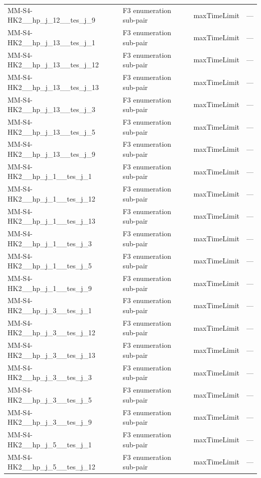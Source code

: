 \begin{table}[htbp]
\begin{tabular}{lllr}
  MM-S4-HK2\_\_hp\_j\_12\_\_tes\_j\_9 & F3 enumeration sub-pair & maxTimeLimit & — \\
  MM-S4-HK2\_\_hp\_j\_13\_\_tes\_j\_1 & F3 enumeration sub-pair & maxTimeLimit & — \\
  MM-S4-HK2\_\_hp\_j\_13\_\_tes\_j\_12 & F3 enumeration sub-pair & maxTimeLimit & — \\
  MM-S4-HK2\_\_hp\_j\_13\_\_tes\_j\_13 & F3 enumeration sub-pair & maxTimeLimit & — \\
  MM-S4-HK2\_\_hp\_j\_13\_\_tes\_j\_3 & F3 enumeration sub-pair & maxTimeLimit & — \\
  MM-S4-HK2\_\_hp\_j\_13\_\_tes\_j\_5 & F3 enumeration sub-pair & maxTimeLimit & — \\
  MM-S4-HK2\_\_hp\_j\_13\_\_tes\_j\_9 & F3 enumeration sub-pair & maxTimeLimit & — \\
  MM-S4-HK2\_\_hp\_j\_1\_\_tes\_j\_1 & F3 enumeration sub-pair & maxTimeLimit & — \\
  MM-S4-HK2\_\_hp\_j\_1\_\_tes\_j\_12 & F3 enumeration sub-pair & maxTimeLimit & — \\
  MM-S4-HK2\_\_hp\_j\_1\_\_tes\_j\_13 & F3 enumeration sub-pair & maxTimeLimit & — \\
  MM-S4-HK2\_\_hp\_j\_1\_\_tes\_j\_3 & F3 enumeration sub-pair & maxTimeLimit & — \\
  MM-S4-HK2\_\_hp\_j\_1\_\_tes\_j\_5 & F3 enumeration sub-pair & maxTimeLimit & — \\
  MM-S4-HK2\_\_hp\_j\_1\_\_tes\_j\_9 & F3 enumeration sub-pair & maxTimeLimit & — \\
  MM-S4-HK2\_\_hp\_j\_3\_\_tes\_j\_1 & F3 enumeration sub-pair & maxTimeLimit & — \\
  MM-S4-HK2\_\_hp\_j\_3\_\_tes\_j\_12 & F3 enumeration sub-pair & maxTimeLimit & — \\
  MM-S4-HK2\_\_hp\_j\_3\_\_tes\_j\_13 & F3 enumeration sub-pair & maxTimeLimit & — \\
  MM-S4-HK2\_\_hp\_j\_3\_\_tes\_j\_3 & F3 enumeration sub-pair & maxTimeLimit & — \\
  MM-S4-HK2\_\_hp\_j\_3\_\_tes\_j\_5 & F3 enumeration sub-pair & maxTimeLimit & — \\
  MM-S4-HK2\_\_hp\_j\_3\_\_tes\_j\_9 & F3 enumeration sub-pair & maxTimeLimit & — \\
  MM-S4-HK2\_\_hp\_j\_5\_\_tes\_j\_1 & F3 enumeration sub-pair & maxTimeLimit & — \\
  MM-S4-HK2\_\_hp\_j\_5\_\_tes\_j\_12 & F3 enumeration sub-pair & maxTimeLimit & — \\

\end{tabular}
\end{table}
